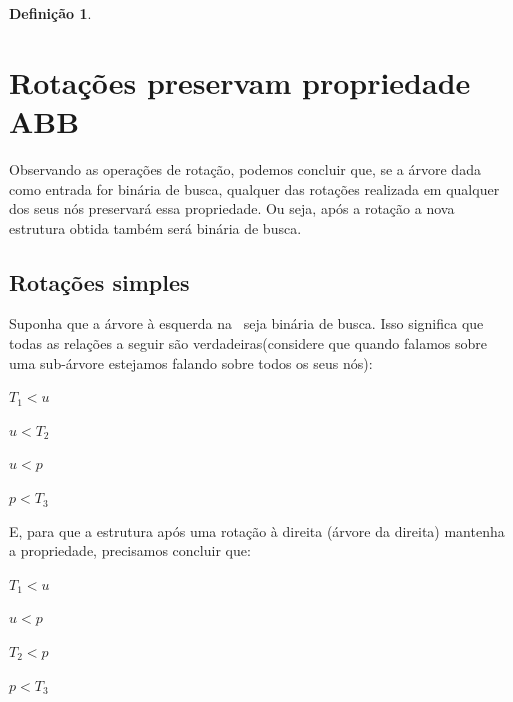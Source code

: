 \documentclass[11pt,twoside]{article}
\theoremstyle{definition}
\newtheorem{definition}{Definição}[section]
\begin{document}
\begin{definition}
\begin{figure}[h]
	\end{figure}
\end{definition}

\section{Rotações preservam propriedade ABB}

Observando as operações de rotação, podemos concluir que, se a árvore dada como entrada for binária de busca, qualquer das rotações realizada em qualquer dos seus nós preservará essa propriedade. Ou seja, após a rotação a nova estrutura obtida também será binária de busca.

\subsection{Rotações simples}
Suponha que a árvore à esquerda na~ seja binária de busca. Isso significa que todas as relações a seguir são verdadeiras(considere que quando falamos sobre uma sub-árvore estejamos falando sobre todos os seus nós):
\begin{itemize}
	\begin{multicols}{2}
		\item \( T_1 < u \)
		\item \( u < T_2 \)
		\item \( u < p \)
		\item \( p < T_3 \)
	\end{multicols}
\end{itemize}

E, para que a estrutura após uma rotação à direita (árvore da direita) mantenha a propriedade, precisamos concluir que:
\begin{itemize}
	\begin{multicols}{2}
		\item \( T_1 < u \)
		\item \( u < p \)
		\item \( T_2 < p \)
		\item \( p < T_3 \)
	\end{multicols}
\end{itemize}
\end{document}

